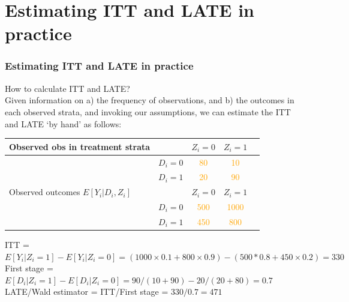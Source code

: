 \documentclass[12pt,english,dvipsnames,aspectratio=169,handout]{beamer}\usepackage[]{graphicx}\usepackage[]{xcolor}
\begin{document}
\section{Estimating ITT and LATE in practice}

\begin{frame}
\frametitle{Estimating ITT and LATE in practice}
How to calculate ITT and LATE?\\
\vspace{2mm}
\footnotesize Given information on a) the frequency of observations, and b) the outcomes in each observed strata, and invoking our assumptions, we can estimate the ITT and LATE `by hand' as follows:
\begin{table}\centering\scriptsize
\begin{tabular}{lcccc}
\hline
Observed obs in treatment strata &    & $Z_i=0$                 & $Z_i=1$ \\ 
      \hline
&     $D_i=0$   & \textcolor{orange}{80} & \textcolor{orange}{10} \\
&     $D_i=1$       & \textcolor{orange}{20}& \textcolor{orange}{90} \\
\hline
\hline
Observed outcomes $E[Y_i|D_i,Z_i]$ &                                 & $Z_i=0$                 & $Z_i=1$ \\ 
      \hline
&     $D_i=0$   & \textcolor{orange}{500} & \textcolor{orange}{1000} \\
&     $D_i=1$       & \textcolor{orange}{450}& \textcolor{orange}{800} \\
\hline
\end{tabular}
\end{table}
\vspace{-3mm}
\scriptsize 
ITT = $E[Y_{i}|Z_i=1] - E[Y_{i}|Z_i=0] = (1000\times 0.1+800\times 0.9) - (500*0.8+450\times 0.2) = 330$ \\
First stage = $E[D_i|Z_i=1]-E[D_i|Z_i=0] = 90/(10+90) - 20/(20+80) = 0.7$ \\
LATE/Wald estimator = ITT/First stage = $330/0.7=471$
\end{frame}
\end{document}
